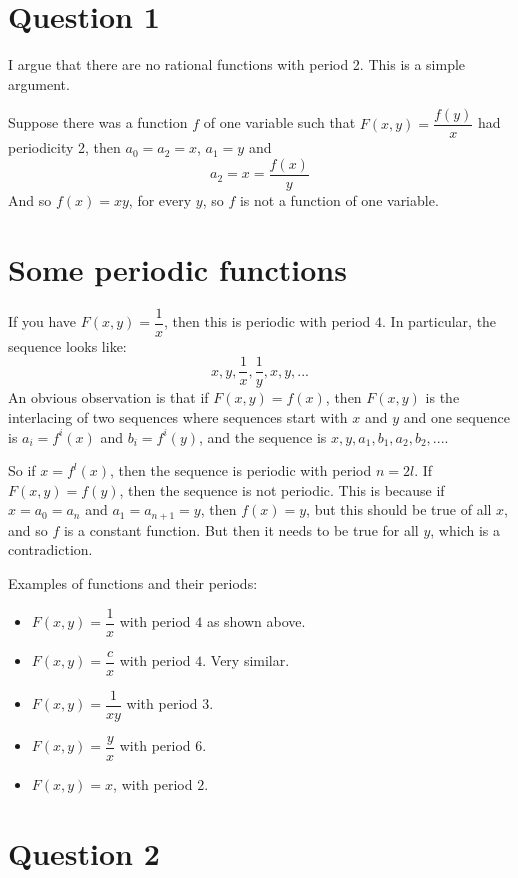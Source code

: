 \documentclass[12pt]{article}
\begin{document}
\maketitle

\section{Question 1}

I argue that there are no rational functions with period 2. This is a simple argument.

Suppose there was a function $f$ of one variable such that $F(x,y) = \dfrac{f(y)}{x}$ had periodicity 2, then $a_0 = a_2 = x$, $a_1 = y$ and
\[ a_2 = x = \dfrac{f(x)}{y} \]
And so $f(x) = xy$, for every $y$, so $f$ is not a function of one variable. 

\section{Some periodic functions}

If you have $F(x,y) = \dfrac{1}{x}$, then this is periodic with period $4$. In particular, the sequence looks like:
\[ x, y, \dfrac{1}{x}, \dfrac{1}{y}, x, y, ... \]
An obvious observation is that if $F(x,y) = f(x)$, then $F(x,y)$ is the interlacing of two sequences where sequences start with $x$ and $y$ and one sequence is $a_i = f^{i}(x)$ and $b_i = f^{i}(y)$, and the sequence is $x,y,a_1, b_1, a_2, b_2, ...$.

So if $x = f^{l}(x)$, then the sequence is periodic with period $n = 2l$. If $F(x,y) = f(y)$, then the sequence is not periodic. This is because if $x = a_0 = a_n$ and $a_1 = a_{n+1} = y$, then $f(x) = y$, but this should be true of all $x$, and so $f$ is a constant function. But then it needs to be true for all $y$, which is a contradiction. 

Examples of functions and their periods:
\begin{itemize}
\item $F(x, y) = \dfrac{1}{x}$ with period $4$ as shown above.
\item $F(x,y) = \dfrac{c}{x}$ with period $4$. Very similar.
\item $F(x,y) = \dfrac{1}{xy}$ with period $3$.
\item $F(x,y) = \dfrac{y}{x}$ with period $6$.
\item $F(x,y) = x$, with period $2$. 
\end{itemize}

\section{Question 2}
\end{document}
